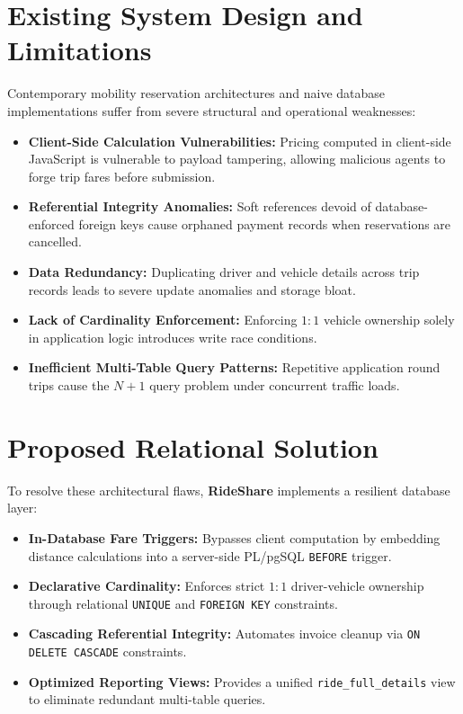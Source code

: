 \section{Existing System Design and Limitations}
Contemporary mobility reservation architectures and naive database implementations suffer from severe structural and operational weaknesses:
\begin{itemize}[itemsep=1.5pt, topsep=2pt, parsep=0pt]
    \item \textbf{Client-Side Calculation Vulnerabilities:} Pricing computed in client-side JavaScript is vulnerable to payload tampering, allowing malicious agents to forge trip fares before submission.
    \item \textbf{Referential Integrity Anomalies:} Soft references devoid of database-enforced foreign keys cause orphaned payment records when reservations are cancelled.
    \item \textbf{Data Redundancy:} Duplicating driver and vehicle details across trip records leads to severe update anomalies and storage bloat.
    \item \textbf{Lack of Cardinality Enforcement:} Enforcing $1:1$ vehicle ownership solely in application logic introduces write race conditions.
    \item \textbf{Inefficient Multi-Table Query Patterns:} Repetitive application round trips cause the $N+1$ query problem under concurrent traffic loads.
\end{itemize}

\section{Proposed Relational Solution}
To resolve these architectural flaws, \textbf{RideShare} implements a resilient database layer:
\begin{itemize}[itemsep=1.5pt, topsep=2pt, parsep=0pt]
    \item \textbf{In-Database Fare Triggers:} Bypasses client computation by embedding distance calculations into a server-side PL/pgSQL \texttt{BEFORE} trigger.
    \item \textbf{Declarative Cardinality:} Enforces strict $1:1$ driver-vehicle ownership through relational \texttt{UNIQUE} and \texttt{FOREIGN KEY} constraints.
    \item \textbf{Cascading Referential Integrity:} Automates invoice cleanup via \texttt{ON DELETE CASCADE} constraints.
    \item \textbf{Optimized Reporting Views:} Provides a unified \texttt{ride\_full\_details} view to eliminate redundant multi-table queries.
\end{itemize}
